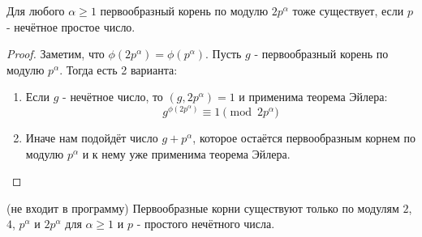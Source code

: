 \begin{theorem}
	Для любого $\alpha \ge 1$ первообразный корень по модулю $2p^\alpha$ тоже существует, если $p$ - нечётное простое число.
\end{theorem}

\begin{proof}
	Заметим, что $\phi(2p^\alpha) = \phi(p^\alpha)$. Пусть $g$ - первообразный корень по модулю $p^\alpha$. Тогда есть 2 варианта:
	\begin{enumerate}
		\item Если $g$ - нечётное число, то $(g, 2p^\alpha) = 1$ и применима теорема Эйлера:
		\[
			g^{\phi(2p^\alpha)} \equiv 1 \pmod {2p^\alpha}
		\]
		
		\item Иначе нам подойдёт число $g + p^\alpha$, которое остаётся первообразным корнем по модулю $p^\alpha$ и к нему уже применима теорема Эйлера.
	\end{enumerate}
\end{proof}

\begin{theorem} (не входит в программу)
	Первообразные корни существуют только по модулям $2$, $4$, $p^\alpha$ и $2p^\alpha$ для $\alpha \ge 1$ и $p$ - простого нечётного числа.
\end{theorem}